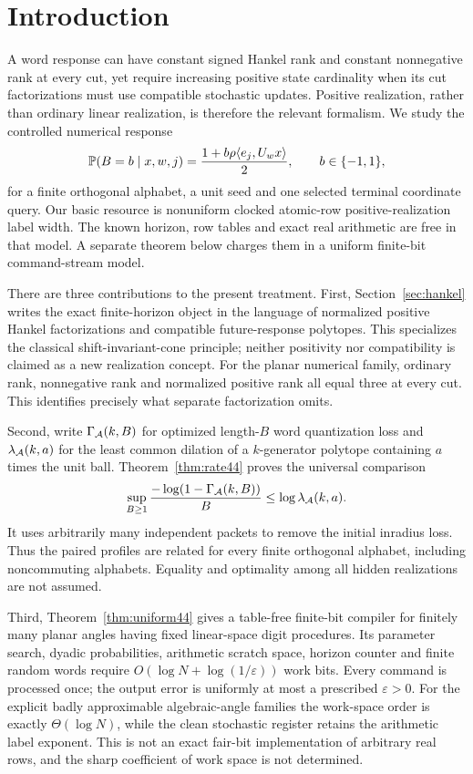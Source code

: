 \section{Introduction}
A word response can have constant signed Hankel rank and constant
nonnegative rank at every cut, yet require increasing positive state
cardinality when its cut factorizations must use compatible stochastic
updates. Positive realization, rather than ordinary linear realization,
is therefore the relevant formalism. We study the controlled numerical
response
\begin{equation}\label{eq:target}
 \mathbb P(B=b\mid x,w,j)=\frac{1+b\rho\langle e_j,U_wx\rangle}2,
 \qquad b\in\{-1,1\},
\end{equation}
for a finite orthogonal alphabet, a unit seed and one selected terminal
coordinate query. Our basic resource is nonuniform clocked atomic-row
positive-realization label width. The known horizon, row tables and
exact real arithmetic are free in that model. A separate theorem below
charges them in a uniform finite-bit command-stream model.

There are three contributions to the present treatment. First,
Section~\ref{sec:hankel} writes the exact finite-horizon object in the
language of normalized positive Hankel factorizations and compatible
future-response polytopes. This specializes the classical
shift-invariant-cone principle; neither positivity nor compatibility is
claimed as a new realization concept. For the planar numerical family,
ordinary rank, nonnegative rank and normalized positive rank all equal
three at every cut. This identifies precisely what separate
factorization omits.

Second, write $\Gamma_{\mathcal A}(k,B)$ for optimized length-$B$ word
quantization loss and $\lambda_{\mathcal A}(k,a)$ for the least common
dilation of a $k$-generator polytope containing $a$ times the unit ball.
Theorem~\ref{thm:rate44} proves the universal comparison
\begin{equation}\label{eq:intro-rate44}
 \sup_{B\ge1}\frac{-\log(1-\Gamma_{\mathcal A}(k,B))}{B}
       \le \log\lambda_{\mathcal A}(k,a).
\end{equation}
It uses arbitrarily many independent packets to remove the initial
inradius loss. Thus the paired profiles are related for every finite
orthogonal alphabet, including noncommuting alphabets. Equality and
optimality among all hidden realizations are not assumed.

Third, Theorem~\ref{thm:uniform44} gives a table-free finite-bit compiler
for finitely many planar angles having fixed linear-space digit
procedures. Its parameter search, dyadic probabilities, arithmetic
scratch space, horizon counter and finite random words require
$O(\log N+\log(1/\varepsilon))$ work bits. Every command is processed
once; the output error is uniformly at most a prescribed
$\varepsilon>0$. For the explicit badly approximable algebraic-angle
families the work-space order is exactly $\Theta(\log N)$, while the
clean stochastic register retains the arithmetic label exponent.
This is not an exact fair-bit implementation of arbitrary real rows,
and the sharp coefficient of work space is not determined.

